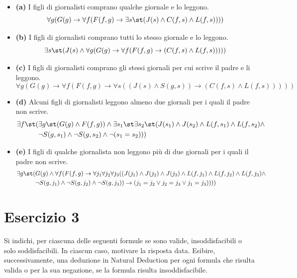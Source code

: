 \begin{itemize}
    \item \textbf{(a)} I figli di giornalisti comprano qualche giornale e lo leggono.
    \[ \forall g(G(g)\rightarrow\forall f(F(f,g)\rightarrow \exists s\st (J(s)\wedge C(f,s)\wedge L(f,s)))) \]
    
    \item \textbf{(b)} I figli di giornalisti comprano tutti lo stesso giornale e lo leggono.
    \[ \exists s\st (J(s)\wedge\forall g(G(g)\rightarrow\forall f(F(f,g)\rightarrow(C(f,s)\wedge L(f,s))))) \]
    
    \item \textbf{(c)} I figli di giornalisti comprano gli stessi giornali per cui scrive il padre e li leggono.
    \[ \forall g(G(g)\rightarrow\forall f(F(f,g)\rightarrow\forall s((J(s)\wedge S(g,s))\rightarrow(C(f,s)\wedge L(f,s))))) \]
    
    \item \textbf{(d)} Alcuni figli di giornalisti leggono almeno due giornali per i quali il padre non scrive.
    \begin{align*} 
    \exists f\st (&\exists g\st (G(g)\wedge F(f,g))\wedge \exists s_1\st \exists s_2\st (J(s_1)\wedge J(s_2)\wedge L(f,s_1)\wedge L(f,s_2)\wedge \\ 
    & \neg S(g,s_1)\wedge\neg S(g,s_2)\wedge\neg(s_1=s_2))) 
    \end{align*}
    
    \item \textbf{(e)} I figli di qualche giornalista non leggono più di due giornali per i quali il padre non scrive.
    \begin{align*}
    \exists g\st (&G(g)\wedge\forall f(F(f,g)\rightarrow\forall j_1\forall j_2\forall j_3((J(j_1)\wedge J(j_2)\wedge J(j_3)\wedge L(f,j_1)\wedge L(f,j_2)\wedge L(f,j_3)\wedge \\
    & \neg S(g,j_1)\wedge\neg S(g,j_2)\wedge\neg S(g,j_3))\rightarrow (j_1=j_2 \vee j_2=j_3 \vee j_1=j_3))))
    \end{align*}
\end{itemize}

\vspace{1cm}
\section*{Esercizio 3}

Si indichi, per ciascuna delle seguenti formule se sono valide, insoddisfacibili o solo soddisfacibili. In ciascun caso, motivare la risposta data.
Esibire, successivamente, una deduzione in Natural Deduction per ogni formula che risulta valida o per la sua negazione, se la formula risulta insoddisfacibile.

